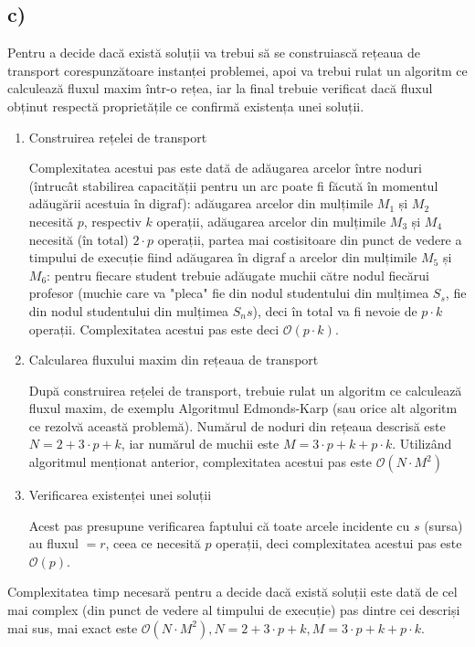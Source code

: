 \documentclass[a4paper,12pt]{article}
\begin{document}
\subsection{c)}

Pentru a decide dacă există soluții va trebui să se construiască rețeaua de transport corespunzătoare instanței problemei, apoi va trebui rulat un algoritm ce calculează fluxul maxim într-o rețea, iar la final trebuie verificat dacă fluxul obținut respectă proprietățile ce confirmă existența unei soluții.

\begin{enumerate}
	\item Construirea rețelei de transport
	
	Complexitatea acestui pas este dată de adăugarea arcelor între noduri (întrucât stabilirea capacității pentru un arc poate fi făcută în momentul adăugării acestuia în digraf): adăugarea arcelor din mulțimile $M_1$ și $M_2$ necesită $p$, respectiv $k$ operații, adăugarea arcelor din mulțimile $M_3$ și $M_4$ necesită (în total) $2 \cdot p$ operații, partea mai costisitoare din punct de vedere a timpului de execuție fiind adăugarea în digraf a arcelor din mulțimile $M_5$ și $M_6$: pentru fiecare student trebuie adăugate muchii către nodul fiecărui profesor (muchie care va "pleca" fie din nodul studentului din mulțimea $S_s$, fie din nodul studentului din mulțimea $S_ns$), deci în total va fi nevoie de $p \cdot k$ operații. Complexitatea acestui pas este deci $\mathcal{O}(p \cdot k)$.
	
	\item Calcularea fluxului maxim din rețeaua de transport
	
	După construirea rețelei de transport, trebuie rulat un algoritm ce calculează fluxul maxim, de exemplu Algoritmul Edmonds-Karp (sau orice alt algoritm ce rezolvă această problemă). Numărul de noduri din rețeaua descrisă este $N = 2 + 3 \cdot p + k$, iar numărul de muchii este $M = 3 \cdot p + k + p \cdot k$. Utilizând algoritmul menționat anterior, complexitatea acestui pas este $\mathcal{O}(N \cdot M^2)$
	
	\item Verificarea existenței unei soluții
	
	Acest pas presupune verificarea faptului că toate arcele incidente cu $s$ (sursa) au fluxul $= r$, ceea ce necesită $p$ operații, deci complexitatea acestui pas este $\mathcal{O}(p)$.  
\end{enumerate}

Complexitatea timp necesară pentru a decide dacă există soluții este dată de cel mai complex (din punct de vedere al timpului de execuție) pas dintre cei descriși mai sus, mai exact este $\mathcal{O}(N \cdot M^2), N = 2 + 3 \cdot p + k, M = 3 \cdot p + k + p \cdot k$.
\end{document}
